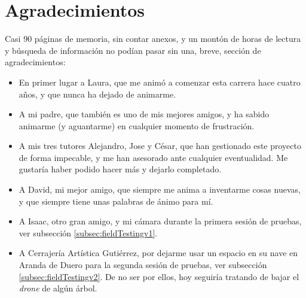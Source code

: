 \section{Agradecimientos}
\label{sec:agradecimientos}

Casi 90 páginas de memoria, sin contar anexos, y un montón de horas de lectura y búsqueda de información no podían pasar sin una, breve, sección de agradecimientos: 

\begin{itemize}
\item En primer lugar a Laura, que me animó a comenzar esta carrera hace cuatro años, y que nunca ha dejado de animarme.
\item A mi padre, que también es uno de mis mejores amigos, y ha sabido animarme (y aguantarme) en cualquier momento de frustración. 
\item A mis tres tutores Alejandro, Jose y César, que han gestionado este proyecto de forma impecable, y me han asesorado ante cualquier eventualidad. Me gustaría haber podido hacer más y dejarlo completado.
\item A David, mi mejor amigo, que siempre me anima a inventarme cosas nuevas, y que siempre tiene unas palabras de ánimo para mí. 
\item A Isaac, otro gran amigo, y mi cámara durante la primera sesión de pruebas, ver subsección \ref{subsec:fieldTestingv1}.
\item A Cerrajería Artística Gutiérrez, por dejarme usar un espacio en su nave en Aranda de Duero para la segunda sesión de pruebas, ver subsección \ref{subsec:fieldTestingv2}. De no ser por ellos, hoy seguiría tratando de bajar el \emph{drone} de algún árbol.
\end{itemize}

















